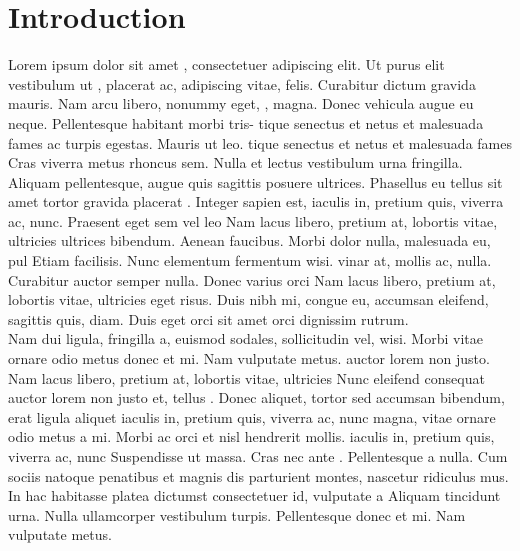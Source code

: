 \documentclass[11pt,a4paper]{article}
\begin{document}
\section{Introduction}

Lorem ipsum dolor sit amet \cite{Phys.Rev.Lett.109.160401} , consectetuer adipiscing elit. Ut purus elit 
vestibulum ut \cite{Ellis:2013yxa}, placerat ac, adipiscing vitae, felis. Curabitur dictum gravida
mauris. Nam arcu libero, nonummy eget, \cite{Phys.Lett.B829(2022)137105, Brod:2013cka,Ellis:2013yxa,Boudjema:2015nda},
magna. Donec \cite{ProbablyWeinberg} vehicula augue eu neque. Pellentesque habitant morbi tris-
tique senectus et netus et malesuada fames ac turpis egestas. Mauris ut leo. tique senectus et netus et malesuada fames 
Cras viverra metus rhoncus sem. Nulla et lectus vestibulum urna fringilla.  Aliquam pellentesque, augue quis sagittis posuere
ultrices. Phasellus eu tellus sit amet tortor gravida placerat \cite{Khachatryan:2016vau,Bhattacharyya:2012tj}. Integer sapien
est, iaculis in, pretium quis, viverra ac, nunc. Praesent eget sem vel leo Nam lacus libero, pretium at, lobortis vitae, ultricies
ultrices bibendum. Aenean faucibus. Morbi dolor nulla, malesuada eu, pul Etiam facilisis. Nunc elementum fermentum wisi. 
vinar at, mollis ac, nulla. Curabitur auctor semper nulla. Donec varius orci Nam lacus libero, pretium at, lobortis vitae, ultricies
eget risus. \cite{hep-ph/9605326,BhupalDev:2007ftb} Duis nibh mi, congue eu, accumsan eleifend, sagittis quis, diam.
Duis eget orci sit amet orci dignissim rutrum.\\

Nam dui ligula, fringilla a, euismod sodales, sollicitudin vel, wisi. Morbi vitae ornare odio metus donec et mi. Nam vulputate metus.
auctor lorem non justo. Nam lacus libero, pretium at, lobortis vitae, ultricies Nunc eleifend consequat auctor lorem non justo
et, tellus \cite{SovietGuy}. Donec aliquet, tortor sed accumsan bibendum, erat ligula aliquet iaculis in, pretium quis, viverra ac, nunc
magna, vitae ornare odio metus a mi. Morbi ac orci et nisl hendrerit mollis.  iaculis in, pretium quis, viverra ac, nunc
Suspendisse ut massa. Cras nec ante \cite{SciPostPhys.7(2019)014,Comput.Phys.Commun.276(2022)108330}. Pellentesque a nulla. Cum sociis
natoque penatibus et magnis dis parturient montes, nascetur ridiculus mus.  In hac habitasse platea dictumst consectetuer id, vulputate a
Aliquam tincidunt urna. Nulla ullamcorper vestibulum turpis. Pellentesque donec et mi. Nam vulputate metus.  
\end{document}
